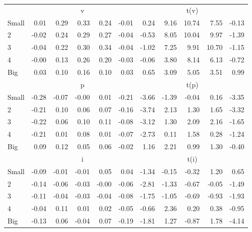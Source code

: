 \begin{table}[!ht]
\begin{tabular}{lrrrrrrrrrr}
  
     & \multicolumn{5}{c}{v} & \multicolumn{5}{c}{t(v)}   \\
     \cmidrule(r){2-6} \cmidrule(r){7-11} 
    Small  & 0.01  & 0.29  & 0.33  & 0.24  & -0.01  & 0.24  & 9.16  & 10.74  & 7.55  & -0.13   \\
    2  & -0.02  & 0.24  & 0.29  & 0.27  & -0.04  & -0.53  & 8.05  & 10.04  & 9.97  & -1.39   \\
    3  & -0.04  & 0.22  & 0.30  & 0.34  & -0.04  & -1.02  & 7.25  & 9.91  & 10.70  & -1.15   \\
    4  & -0.00  & 0.13  & 0.26  & 0.20  & -0.03  & -0.06  & 3.80  & 8.14  & 6.13  & -0.72   \\
    Big  & 0.03  & 0.10  & 0.16  & 0.10  & 0.03  & 0.65  & 3.09  & 5.05  & 3.51  & 0.99   \\
    
  
     & \multicolumn{5}{c}{p} & \multicolumn{5}{c}{t(p)}   \\
     \cmidrule(r){2-6} \cmidrule(r){7-11} 
    Small  & -0.28  & -0.07  & -0.00  & 0.01  & -0.21  & -3.66  & -1.39  & -0.04  & 0.16  & -3.35   \\
    2  & -0.21  & 0.10  & 0.06  & 0.07  & -0.16  & -3.74  & 2.13  & 1.30  & 1.65  & -3.32   \\
    3  & -0.22  & 0.06  & 0.10  & 0.11  & -0.08  & -3.12  & 1.30  & 2.09  & 2.16  & -1.65   \\
    4  & -0.21  & 0.01  & 0.08  & 0.01  & -0.07  & -2.73  & 0.11  & 1.58  & 0.28  & -1.24   \\
    Big  & 0.09  & 0.12  & 0.05  & 0.06  & -0.02  & 1.16  & 2.21  & 0.99  & 1.30  & -0.40   \\
    
  
     & \multicolumn{5}{c}{i} & \multicolumn{5}{c}{t(i)}   \\
     \cmidrule(r){2-6} \cmidrule(r){7-11} 
    Small  & -0.09  & -0.01  & -0.01  & 0.05  & 0.04  & -1.34  & -0.15  & -0.32  & 1.20  & 0.65   \\
    2  & -0.14  & -0.06  & -0.03  & -0.00  & -0.06  & -2.81  & -1.33  & -0.67  & -0.05  & -1.49   \\
    3  & -0.11  & -0.04  & -0.03  & -0.04  & -0.08  & -1.75  & -1.05  & -0.69  & -0.93  & -1.93   \\
    4  & -0.04  & 0.11  & 0.01  & 0.02  & -0.05  & -0.66  & 2.36  & 0.20  & 0.38  & -0.95   \\
    Big  & -0.13  & 0.06  & -0.04  & 0.07  & -0.19  & -1.81  & 1.27  & -0.87  & 1.78  & -4.14   \\
    

\end{tabular}
\end{table}
